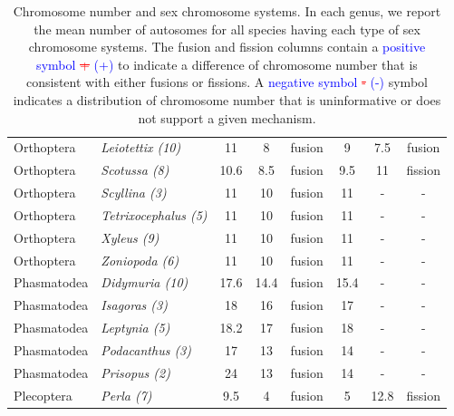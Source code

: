 \documentclass[]{rsos}%
\begin{document}
\begin{table}[h!]
\begin{tabular}{llcccccc}
Orthoptera  & \textit{Leiotettix (10)}     & 11   & 8    & fusion & 9    & 7.5   & fusion  \\
Orthoptera  & \textit{Scotussa (8)}        & 10.6 & 8.5  & fusion & 9.5  & 11    & fission \\
Orthoptera  & \textit{Scyllina (3)}        & 11   & 10   & fusion & 11   & -     & -       \\
Orthoptera  & \textit{Tetrixocephalus (5)} & 11   & 10   & fusion & 11   & -     & -       \\
Orthoptera  & \textit{Xyleus (9)}          & 11   & 10   & fusion & 11   & -     & -       \\
Orthoptera  & \textit{Zoniopoda (6)}       & 11   & 10   & fusion & 11   & -     & -       \\
Phasmatodea & \textit{Didymuria (10)}      & 17.6 & 14.4 & fusion & 15.4 & -     & -       \\
Phasmatodea & \textit{Isagoras (3)}        & 18   & 16   & fusion & 17   & -     & -       \\
Phasmatodea & \textit{Leptynia (5)}        & 18.2 & 17   & fusion & 18   & -     & -       \\
Phasmatodea & \textit{Podacanthus (3)}     & 17   & 13   & fusion & 14   & -     & -       \\
Phasmatodea & \textit{Prisopus (2)}        & 24   & 13   & fusion & 14   & -     & -       \\
Plecoptera  & \textit{Perla (7)}           & 9.5  & 4    & fusion & 5    & 12.8  & fission \\ \hline
\end{tabular}
\caption{Chromosome number and sex chromosome systems. In each genus, we report the mean number of autosomes for all species having each type of sex chromosome systems. The fusion and fission columns contain a
\textcolor{blue}{positive symbol} \textcolor{red}{\st{+}} \textcolor{blue}{(+)} to indicate a difference of chromosome number that is consistent with either fusions or fissions. A \textcolor{blue}{negative symbol} \textcolor{red}{\st{-}} \textcolor{blue}{(-)} symbol indicates a distribution of chromosome number that is uninformative or does not support a given mechanism.}
\label{tab:fusions}
\end{table}





\vspace*{-10pt}
\end{document}
